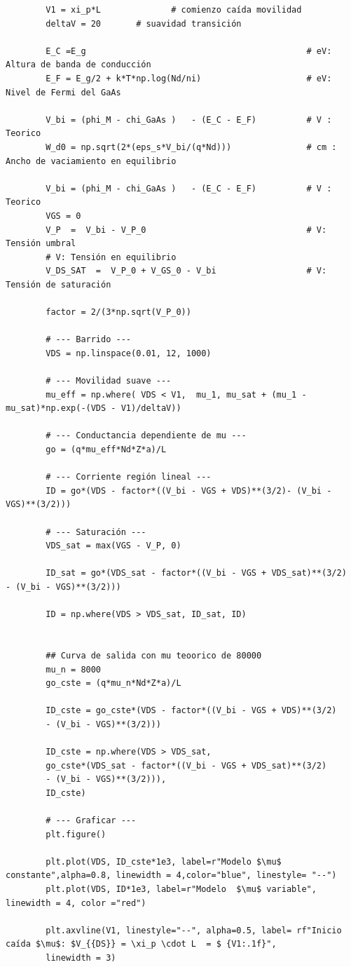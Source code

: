 \documentclass[a4paper]{article}
\begin{document}
\begin{verbatim}
		V1 = xi_p*L              # comienzo caída movilidad
		deltaV = 20       # suavidad transición
	
		E_C =E_g                                            # eV: Altura de banda de conducción
		E_F = E_g/2 + k*T*np.log(Nd/ni)                     # eV: Nivel de Fermi del GaAs
		
		V_bi = (phi_M - chi_GaAs )   - (E_C - E_F)          # V : Teorico
		W_d0 = np.sqrt(2*(eps_s*V_bi/(q*Nd)))               # cm : Ancho de vaciamiento en equilibrio
		
		V_bi = (phi_M - chi_GaAs )   - (E_C - E_F)          # V : Teorico
		VGS = 0
		V_P  =  V_bi - V_P_0                                # V: Tensión umbral
		# V: Tensión en equilibrio
		V_DS_SAT  =  V_P_0 + V_GS_0 - V_bi                  # V: Tensión de saturación
		
		factor = 2/(3*np.sqrt(V_P_0))
		
		# --- Barrido ---
		VDS = np.linspace(0.01, 12, 1000)
		
		# --- Movilidad suave ---
		mu_eff = np.where( VDS < V1,  mu_1, mu_sat + (mu_1 - mu_sat)*np.exp(-(VDS - V1)/deltaV))
		
		# --- Conductancia dependiente de mu ---
		go = (q*mu_eff*Nd*Z*a)/L
		
		# --- Corriente región lineal ---
		ID = go*(VDS - factor*((V_bi - VGS + VDS)**(3/2)- (V_bi - VGS)**(3/2)))
		
		# --- Saturación ---
		VDS_sat = max(VGS - V_P, 0)
		
		ID_sat = go*(VDS_sat - factor*((V_bi - VGS + VDS_sat)**(3/2)  - (V_bi - VGS)**(3/2)))
		
		ID = np.where(VDS > VDS_sat, ID_sat, ID)
		
		
		## Curva de salida con mu teoorico de 80000
		mu_n = 8000
		go_cste = (q*mu_n*Nd*Z*a)/L
		
		ID_cste = go_cste*(VDS - factor*((V_bi - VGS + VDS)**(3/2)
		- (V_bi - VGS)**(3/2)))
		
		ID_cste = np.where(VDS > VDS_sat,
		go_cste*(VDS_sat - factor*((V_bi - VGS + VDS_sat)**(3/2)
		- (V_bi - VGS)**(3/2))),
		ID_cste)
		
		# --- Graficar ---
		plt.figure()
		
		plt.plot(VDS, ID_cste*1e3, label=r"Modelo $\mu$ constante",alpha=0.8, linewidth = 4,color="blue", linestyle= "--")
		plt.plot(VDS, ID*1e3, label=r"Modelo  $\mu$ variable", linewidth = 4, color ="red")
		
		plt.axvline(V1, linestyle="--", alpha=0.5, label= rf"Inicio caída $\mu$: $V_{{DS}} = \xi_p \cdot L  = $ {V1:.1f}",
		linewidth = 3)
		

\end{verbatim}
\end{document}
